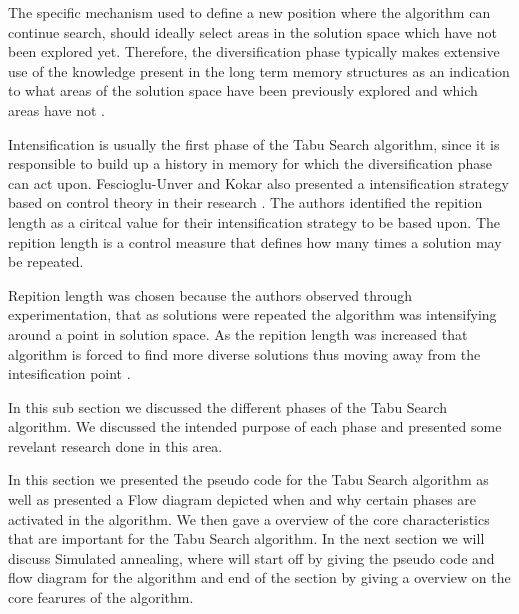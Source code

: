 The specific mechanism used to define a new position where the algorithm can continue search, should ideally select areas in the solution space which have not been explored yet. Therefore, the diversification phase typically makes extensive use of the knowledge present in the long term memory structures as an indication to what areas of the solution space have been previously explored and which areas have not \cite{TabuParameterization,TabuCrewSchedulingProblem,NonlinearGlobalTabu,SelfControllingReactiveTabu}.

Intensification is usually the first phase of the Tabu Search algorithm, since it is responsible to build up a history in memory for which the diversification phase can act upon. Fescioglu-Unver and Kokar also presented a intensification strategy based on control theory in their research \cite{SelfControllingReactiveTabu}. The authors identified the repition length as a ciritcal value for their intensification strategy to be based upon. The repition length is a control measure that defines how many times a solution may be repeated.

Repition length was chosen because the authors observed through experimentation, that as solutions were repeated the algorithm was intensifying around a point in solution space. As the repition length was increased that algorithm is forced to find more diverse solutions thus moving away from the intesification point \cite{SelfControllingReactiveTabu}.

In this sub section we discussed the different phases of the Tabu Search algorithm. We discussed the intended purpose of each phase and presented some revelant research done in this area.

In this section we presented the pseudo code for the Tabu Search algorithm as well as presented a Flow diagram depicted when and why certain phases are activated in the algorithm. We then gave a overview of the core characteristics that are important for the Tabu Search algorithm. In the next section we will discuss Simulated annealing, where will start off by giving the pseudo code and flow diagram for the algorithm and end of the section by giving a overview on the core fearures of the algorithm.

